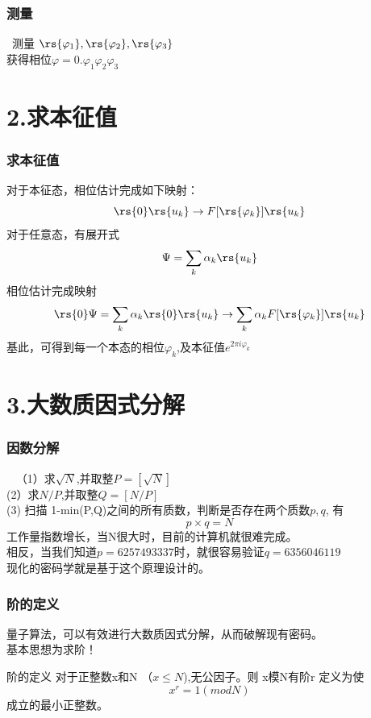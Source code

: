 \begin{frame}
    \frametitle{测量}
    {\Bullet}~测量 $\rs{\varphi_1},\rs{\varphi_2},\rs{\varphi_3} $\\\vspace{2em}
    获得相位$\varphi=0.\varphi_1\varphi_2\varphi_3$ \\ 


\end{frame}

\section{2.求本征值}

\begin{frame}
    \frametitle{求本征值}
    对于本征态，相位估计完成如下映射：
    \[\rs{0}\rs{u_k}\to F[\rs{\varphi_k}]\rs{u_k}\]
    对于任意态，有展开式
    \[\Psi=\sum_k \alpha_k \rs{u_k}\]
    相位估计完成映射
    \[\rs{0}\Psi = \sum_k \alpha_k \rs{0} \rs{u_k}\to \sum_k \alpha_k F[\rs{\varphi_k}]\rs{u_k}\]
    基此，可得到每一个本态的相位$\varphi_k$,及本征值$e^{2\pi i \varphi_k}$
\end{frame}


\section{3.大数质因式分解}

\begin{frame}
    \frametitle{因数分解}
    \例 [试问，下面这个数能不能做质因式分解]
    {\[N=39772916239307209103\]}
    \解~ （1）求$\sqrt{N}$,并取整$P=[\sqrt{N}]$ \\
    (2）求$N/P$,并取整$Q=[N/P]$ \\
    (3) 扫描 1-min(P,Q)之间的所有质数，判断是否存在两个质数$p,q$, 有
    \[p \times q = N\]
    工作量指数增长，当N很大时，目前的计算机就很难完成。\\
    相反，当我们知道$p=6257493337$时，就很容易验证$q=6356046119$ \\
    现化的密码学就是基于这个原理设计的。
\end{frame}

\begin{frame}
    \frametitle{阶的定义}
    量子算法，可以有效进行大数质因式分解，从而破解现有密码。\\
    基本思想为求阶！\\
    \begin{tcolorbox1}[0.86]{阶的定义}
    对于正整数x和N （$x\le N$),无公因子。则 x模N有阶r 定义为使
        \[x^r=1(mod N)\]
    成立的最小正整数。
    \end{tcolorbox1}  
\end{frame}

